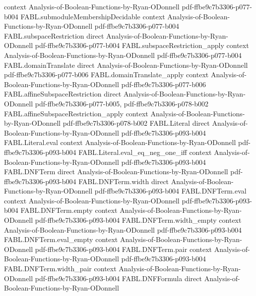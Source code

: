 \begin{theorem}
  {context}
  {Analysis-of-Boolean-Functions-by-Ryan-ODonnell}
  {pdf-ffbe9c7b3306-p077-b004}
\proofstep
  {FABL.submoduleMembershipDecidable}
  {context}
  {Analysis-of-Boolean-Functions-by-Ryan-ODonnell}
  {pdf-ffbe9c7b3306-p077-b004}
\proofstep
  {FABL.subspaceRestriction}
  {direct}
  {Analysis-of-Boolean-Functions-by-Ryan-ODonnell}
  {pdf-ffbe9c7b3306-p077-b004}
\proofstep
  {FABL.subspaceRestriction_apply}
  {context}
  {Analysis-of-Boolean-Functions-by-Ryan-ODonnell}
  {pdf-ffbe9c7b3306-p077-b004}
\proofstep
  {FABL.domainTranslate}
  {direct}
  {Analysis-of-Boolean-Functions-by-Ryan-ODonnell}
  {pdf-ffbe9c7b3306-p077-b006}
\proofstep
  {FABL.domainTranslate_apply}
  {context}
  {Analysis-of-Boolean-Functions-by-Ryan-ODonnell}
  {pdf-ffbe9c7b3306-p077-b006}
\proofstep
  {FABL.affineSubspaceRestriction}
  {direct}
  {Analysis-of-Boolean-Functions-by-Ryan-ODonnell}
  {pdf-ffbe9c7b3306-p077-b005,
    pdf-ffbe9c7b3306-p078-b002}
\proofstep
  {FABL.affineSubspaceRestriction_apply}
  {context}
  {Analysis-of-Boolean-Functions-by-Ryan-ODonnell}
  {pdf-ffbe9c7b3306-p078-b002}
\proofstep
  {FABL.Literal}
  {direct}
  {Analysis-of-Boolean-Functions-by-Ryan-ODonnell}
  {pdf-ffbe9c7b3306-p093-b004}
\proofstep
  {FABL.Literal.eval}
  {context}
  {Analysis-of-Boolean-Functions-by-Ryan-ODonnell}
  {pdf-ffbe9c7b3306-p093-b004}
\proofstep
  {FABL.Literal.eval_eq_neg_one_iff}
  {context}
  {Analysis-of-Boolean-Functions-by-Ryan-ODonnell}
  {pdf-ffbe9c7b3306-p093-b004}
\proofstep
  {FABL.DNFTerm}
  {direct}
  {Analysis-of-Boolean-Functions-by-Ryan-ODonnell}
  {pdf-ffbe9c7b3306-p093-b004}
\proofstep
  {FABL.DNFTerm.width}
  {direct}
  {Analysis-of-Boolean-Functions-by-Ryan-ODonnell}
  {pdf-ffbe9c7b3306-p093-b004}
\proofstep
  {FABL.DNFTerm.eval}
  {context}
  {Analysis-of-Boolean-Functions-by-Ryan-ODonnell}
  {pdf-ffbe9c7b3306-p093-b004}
\proofstep
  {FABL.DNFTerm.empty}
  {context}
  {Analysis-of-Boolean-Functions-by-Ryan-ODonnell}
  {pdf-ffbe9c7b3306-p093-b004}
\proofstep
  {FABL.DNFTerm.width_empty}
  {context}
  {Analysis-of-Boolean-Functions-by-Ryan-ODonnell}
  {pdf-ffbe9c7b3306-p093-b004}
\proofstep
  {FABL.DNFTerm.eval_empty}
  {context}
  {Analysis-of-Boolean-Functions-by-Ryan-ODonnell}
  {pdf-ffbe9c7b3306-p093-b004}
\proofstep
  {FABL.DNFTerm.pair}
  {context}
  {Analysis-of-Boolean-Functions-by-Ryan-ODonnell}
  {pdf-ffbe9c7b3306-p093-b004}
\proofstep
  {FABL.DNFTerm.width_pair}
  {context}
  {Analysis-of-Boolean-Functions-by-Ryan-ODonnell}
  {pdf-ffbe9c7b3306-p093-b004}
\proofstep
  {FABL.DNFFormula}
  {direct}
  {Analysis-of-Boolean-Functions-by-Ryan-ODonnell}

\end{theorem}
